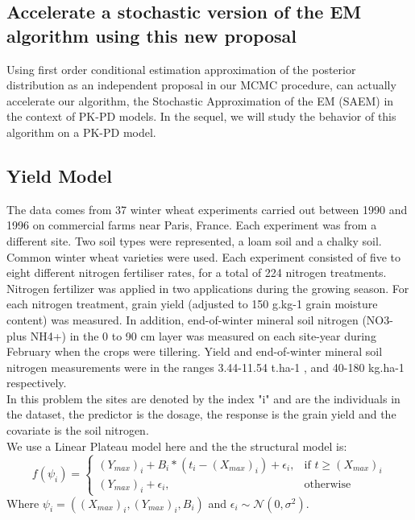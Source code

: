 \documentclass{article}
\begin{document}



\newpage
\begin{appendices}
\section{Accelerate a stochastic version of the EM algorithm using this new proposal}
Using \citep{wang} first order conditional estimation approximation of the posterior distribution as an independent proposal in our MCMC procedure, can actually accelerate our algorithm, the Stochastic Approximation of the EM (SAEM) in the context of PK-PD models. In the sequel, we will study the behavior of this algorithm on a PK-PD model.
\subsection{Yield Model}
The data comes from 37 winter wheat experiments carried out between 1990
and 1996 on commercial farms near Paris, France. Each experiment was from a different site. Two
soil types were represented, a loam soil and a chalky soil. Common winter wheat varieties were
used. Each experiment consisted of five to eight different nitrogen fertiliser rates, for a total of 224 nitrogen treatments. Nitrogen fertilizer was applied in two applications during the growing season. For each nitrogen treatment, grain yield (adjusted to 150 g.kg-1 grain moisture content) was measured. In addition, end-of-winter mineral soil nitrogen (NO3- plus NH4+) in the 0 to 90 cm layer was measured on each site-year during February when the crops were tillering. Yield and end-of-winter mineral soil nitrogen measurements were in the ranges 3.44-11.54 t.ha-1 , and 40-180 kg.ha-1 respectively.\\
In this problem the sites are denoted by the index "i" and are the individuals in the dataset, the predictor is the dosage, the response is the grain yield and the covariate is the soil nitrogen.\\

We use a Linear Plateau model here and the the structural model is:
\begin{equation}
    f(\psi_i)= 
\begin{cases}
    (Y_{max})_i + B_i*(t_i-(X_{max})_i) + \epsilon_i,& \text{if } t\geq (X_{max})_i\\
    (Y_{max})_i+ \epsilon_i,              & \text{otherwise}
\end{cases}
\end{equation}
Where $\psi_i=((X_{max})_i,(Y_{max})_i,B_i)$ and $\epsilon_i  \sim \mathcal{N}(0,\sigma^2)$.


\end{appendices}
\end{document}
